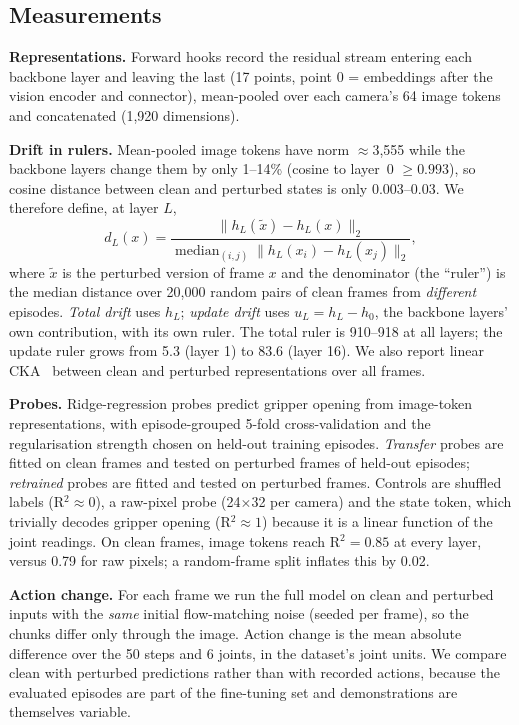 \documentclass[conference]{IEEEtran}
\begin{document}
\subsection{Measurements}
\textbf{Representations.} Forward hooks record the residual stream entering each backbone layer and leaving the last (17 points, point 0 = embeddings after the vision encoder and connector), mean-pooled over each camera's 64 image tokens and concatenated (1,920 dimensions).

\textbf{Drift in rulers.} Mean-pooled image tokens have norm $\approx$3,555 while the backbone layers change them by only 1--14\% (cosine to layer~0 $\geq 0.993$), so cosine distance between clean and perturbed states is only 0.003--0.03. We therefore define, at layer $L$,
\begin{equation}
  d_L(x) = \frac{\lVert h_L(\tilde{x}) - h_L(x) \rVert_2}{\operatorname{median}_{(i,j)} \lVert h_L(x_i) - h_L(x_j) \rVert_2},
\end{equation}
where $\tilde{x}$ is the perturbed version of frame $x$ and the denominator (the ``ruler'') is the median distance over 20,000 random pairs of clean frames from \emph{different} episodes. \emph{Total drift} uses $h_L$; \emph{update drift} uses $u_L = h_L - h_0$, the backbone layers' own contribution, with its own ruler. The total ruler is 910--918 at all layers; the update ruler grows from 5.3 (layer 1) to 83.6 (layer 16). We also report linear CKA~\cite{kornblith2019cka} between clean and perturbed representations over all frames.

\textbf{Probes.} Ridge-regression probes predict gripper opening from image-token representations, with episode-grouped 5-fold cross-validation and the regularisation strength chosen on held-out training episodes. \emph{Transfer} probes are fitted on clean frames and tested on perturbed frames of held-out episodes; \emph{retrained} probes are fitted and tested on perturbed frames. Controls are shuffled labels (R$^2 \approx 0$), a raw-pixel probe (24$\times$32 per camera) and the state token, which trivially decodes gripper opening (R$^2 \approx 1$) because it is a linear function of the joint readings. On clean frames, image tokens reach R$^2 = 0.85$ at every layer, versus 0.79 for raw pixels; a random-frame split inflates this by 0.02.

\textbf{Action change.} For each frame we run the full model on clean and perturbed inputs with the \emph{same} initial flow-matching noise (seeded per frame), so the chunks differ only through the image. Action change is the mean absolute difference over the 50 steps and 6 joints, in the dataset's joint units. We compare clean with perturbed predictions rather than with recorded actions, because the evaluated episodes are part of the fine-tuning set and demonstrations are themselves variable.
\end{document}
